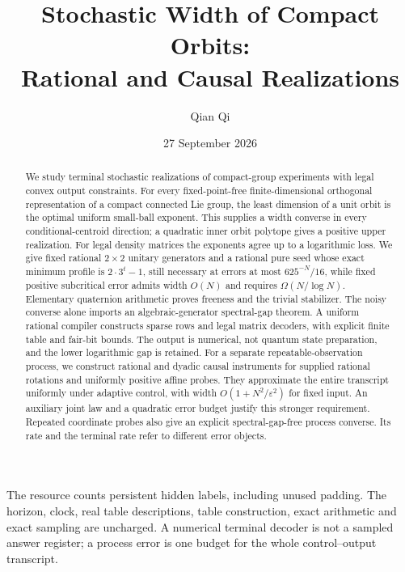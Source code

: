 \documentclass[11pt]{amsart}
\title[Compact orbits and causal realization]{Stochastic Width of Compact Orbits:\\Rational and Causal Realizations}
\author{Qian Qi}
\date{27 September 2026}
\numberwithin{equation}{section}
\theoremstyle{definition}\newtheorem{definition}[theorem]{Definition}
\theoremstyle{remark}\newtheorem{remark}[theorem]{Remark}
\begin{document}
\begin{abstract}
We study terminal stochastic realizations of compact-group experiments
with legal convex output constraints. For every fixed-point-free
finite-dimensional orthogonal representation of a compact connected Lie
group, the least dimension of a unit orbit is the optimal uniform
small-ball exponent. This supplies a width converse in every
conditional-centroid direction; a quadratic inner orbit polytope gives
a positive upper realization. For legal density matrices the exponents
agree up to a logarithmic loss. We give fixed rational $2\times2$ unitary
generators and a rational pure seed whose exact minimum profile is
$2\cdot3^t-1$, still necessary at errors at most $625^{-N}/16$, while
fixed positive subcritical error admits width $O(N)$ and requires
$\Omega(N/\log N)$. Elementary quaternion arithmetic proves freeness
and the trivial stabilizer. The noisy converse alone imports an
algebraic-generator spectral-gap theorem. A uniform rational compiler
constructs sparse rows and legal matrix decoders, with explicit finite
table and fair-bit bounds. The output is numerical, not quantum state
preparation, and the lower logarithmic gap is retained.
 For a separate
repeatable-observation process, we construct rational and dyadic causal
instruments for supplied rational rotations and uniformly positive
affine probes. They approximate the entire transcript uniformly under
adaptive control, with width $O(1+N^2/\varepsilon^2)$ for fixed input.
An auxiliary joint law and a quadratic error budget justify this
stronger requirement. Repeated coordinate probes also give an explicit
spectral-gap-free process converse. Its rate and the terminal rate
refer to different error objects.
\end{abstract}
\maketitle
\noindent The resource counts persistent hidden labels, including unused
padding. The horizon, clock, real table descriptions, table construction,
exact arithmetic and exact sampling are uncharged. A numerical terminal
decoder is not a sampled answer register; a process error is one budget
for the whole control--output transcript.














\end{document}
